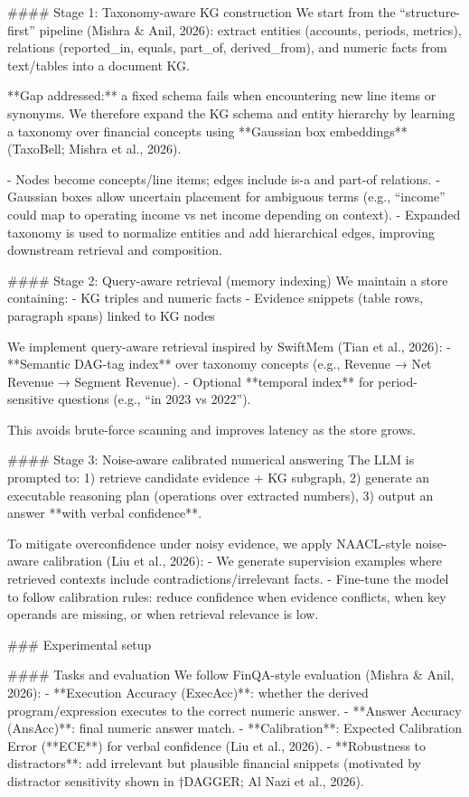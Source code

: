 #### Stage 1: Taxonomy-aware KG construction  
We start from the “structure-first” pipeline (Mishra & Anil, 2026): extract entities (accounts, periods, metrics), relations (reported_in, equals, part_of, derived_from), and numeric facts from text/tables into a document KG.

**Gap addressed:** a fixed schema fails when encountering new line items or synonyms. We therefore expand the KG schema and entity hierarchy by learning a taxonomy over financial concepts using **Gaussian box embeddings** (TaxoBell; Mishra et al., 2026).  

- Nodes become concepts/line items; edges include is-a and part-of relations.  
- Gaussian boxes allow uncertain placement for ambiguous terms (e.g., “income” could map to operating income vs net income depending on context).  
- Expanded taxonomy is used to normalize entities and add hierarchical edges, improving downstream retrieval and composition.

#### Stage 2: Query-aware retrieval (memory indexing)  
We maintain a store containing:  
- KG triples and numeric facts  
- Evidence snippets (table rows, paragraph spans) linked to KG nodes  

We implement query-aware retrieval inspired by SwiftMem (Tian et al., 2026):  
- **Semantic DAG-tag index** over taxonomy concepts (e.g., Revenue → Net Revenue → Segment Revenue).  
- Optional **temporal index** for period-sensitive questions (e.g., “in 2023 vs 2022”).  

This avoids brute-force scanning and improves latency as the store grows.

#### Stage 3: Noise-aware calibrated numerical answering  
The LLM is prompted to:  
1) retrieve candidate evidence + KG subgraph,  
2) generate an executable reasoning plan (operations over extracted numbers),  
3) output an answer **with verbal confidence**.

To mitigate overconfidence under noisy evidence, we apply NAACL-style noise-aware calibration (Liu et al., 2026):  
- We generate supervision examples where retrieved contexts include contradictions/irrelevant facts.  
- Fine-tune the model to follow calibration rules: reduce confidence when evidence conflicts, when key operands are missing, or when retrieval relevance is low.

### Experimental setup  

#### Tasks and evaluation  
We follow FinQA-style evaluation (Mishra & Anil, 2026):  
- **Execution Accuracy (ExecAcc)**: whether the derived program/expression executes to the correct numeric answer.  
- **Answer Accuracy (AnsAcc)**: final numeric answer match.  
- **Calibration**: Expected Calibration Error (**ECE**) for verbal confidence (Liu et al., 2026).  
- **Robustness to distractors**: add irrelevant but plausible financial snippets (motivated by distractor sensitivity shown in †DAGGER; Al Nazi et al., 2026).

